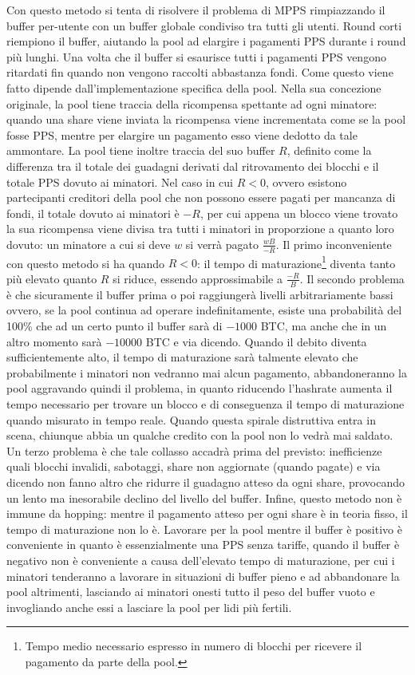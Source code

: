 Con questo metodo si tenta di risolvere il problema di MPPS rimpiazzando il buffer per-utente con un buffer globale condiviso tra tutti gli utenti. Round corti riempiono il buffer, aiutando la pool ad elargire i pagamenti PPS durante i round più lunghi. Una volta che il buffer si esaurisce tutti i pagamenti PPS vengono ritardati fin quando non vengono raccolti abbastanza fondi. Come questo viene fatto dipende dall'implementazione specifica della pool.
Nella sua concezione originale, la pool tiene traccia della ricompensa spettante ad ogni minatore: quando una share viene inviata la ricompensa viene incrementata come se la pool fosse PPS, mentre per elargire un pagamento esso viene dedotto da tale ammontare. La pool tiene inoltre traccia del suo buffer $R$, definito come la differenza tra il totale dei guadagni derivati dal ritrovamento dei blocchi e il totale PPS dovuto ai minatori.
Nel caso in cui $R < 0$, ovvero esistono partecipanti creditori della pool che non possono essere pagati per mancanza di fondi, il totale dovuto ai minatori è $-R$, per cui appena un blocco viene trovato la sua ricompensa viene divisa tra tutti i minatori in proporzione a quanto loro dovuto: un minatore a cui si deve $w$ si verrà pagato $\frac{wB}{-R}$.
Il primo inconveniente con questo metodo si ha quando $R<0$: il tempo di maturazione\footnote{Tempo medio necessario espresso in numero di blocchi per ricevere il pagamento da parte della pool.} diventa tanto più elevato quanto $R$ si riduce, essendo approssimabile a $\frac{-R}{B}$.
Il secondo problema è che sicuramente il buffer prima o poi raggiungerà livelli arbitrariamente bassi ovvero, se la pool continua ad operare indefinitamente, esiste una probabilità del 100\% che ad un certo punto il buffer sarà di $-1000$ BTC, ma anche che in un altro momento sarà $-10000$ BTC e via dicendo. Quando il debito diventa sufficientemente alto, il tempo di maturazione sarà talmente elevato che probabilmente i minatori non vedranno mai alcun pagamento, abbandoneranno la pool aggravando quindi il problema, in quanto riducendo l'hashrate aumenta il tempo necessario per trovare un blocco e di conseguenza il tempo di maturazione quando misurato in tempo reale. Quando questa spirale distruttiva entra in scena, chiunque abbia un qualche credito con la pool non lo vedrà mai saldato.
Un terzo problema è che tale collasso accadrà prima del previsto: inefficienze quali blocchi invalidi, sabotaggi, share non aggiornate (quando pagate) e via dicendo non fanno altro che ridurre il guadagno atteso da ogni share, provocando un lento ma inesorabile declino del livello del buffer.
Infine, questo metodo non è immune da hopping: mentre il pagamento atteso per ogni share è in teoria fisso, il tempo di maturazione non lo è. Lavorare per la pool mentre il buffer è positivo è conveniente in quanto è essenzialmente una PPS senza tariffe, quando il buffer è negativo non è conveniente a causa dell'elevato tempo di maturazione, per cui i minatori tenderanno a lavorare in situazioni di buffer pieno e ad abbandonare la pool altrimenti, lasciando ai minatori onesti tutto il peso del buffer vuoto e invogliando anche essi a lasciare la pool per lidi più fertili.

